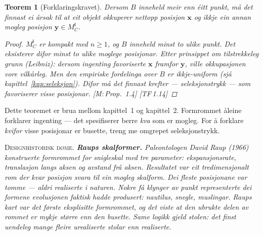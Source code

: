 \documentclass[10pt]{book}
\theoremstyle{definition}
\theoremstyle{plain}
\newtheorem{teorem}[definisjon]{Teorem}
\theoremstyle{remark}
\newenvironment{designhistorie}%
  {\medskip\noindent\textsc{Designhistorisk d\o me.}\itshape\enspace}%
  {\medskip}
\newcommand{\MC}{M^{\mathsf{I}}_C}
\newcommand{\TF}[1]{\textnormal{[TF\,#1]}}
\newcommand{\Mref}[1]{\textnormal{[M:\,#1]}}
\begin{document}
\begin{teorem}[Forklaringskravet]\label{thm:forklaring}
Dersom $B$ inneheld meir enn \' eitt punkt, m\aa{} det finnast ei \aa rsak til at eit objekt okkuperer nettopp posisjon $\bm{x}$ og ikkje ein annan mogleg posisjon $\bm{y} \in \MC$.

\begin{proof}
$\MC$ er kompakt med $n \geq 1$, og $B$ inneheld minst to ulike punkt. Det eksisterer difor minst to ulike moglege posisjonar. Etter prinsippet om tilstrekkeleg grunn (Leibniz): dersom ingenting favoriserte $\bm{x}$ framfor $\bm{y}$, ville okkupasjonen vore vilk\aa rleg. Men den empiriske fordelinga over $B$ er ikkje-uniform (sjå kapittel~\ref{kap:seleksjon}). Difor m\aa{} det finnast krefter --- \emph{seleksjonstrykk} --- som favoriserer visse posisjonar. \Mref{Prop.~1.4} \TF{1.14}
\end{proof}
\end{teorem}

Dette teoremet er brua mellom kapittel~1 og kapittel~2. Formrommet åleine forklarer ingenting --- det spesifiserer berre \emph{kva} som er mogleg. For \aa{} forklare \emph{kvifor} visse posisjonar er busette, treng me omgrepet seleksjonstrykk.

\begin{designhistorie}
\textbf{Raups skalformer.} Paleontologen David Raup (1966) konstruerte formrommet for snigleskal med tre parameter: ekspansjonsrate, translasjon langs aksen og avstand fr\aa{} aksen. Resultatet var eit tredimensjonalt rom der kvar posisjon svara til ein mogleg skalform. Dei fleste posisjonane var tomme --- aldri realiserte i naturen. Nokre f\aa{} klynger av punkt representerte dei formene evolusjonen faktisk hadde produsert: nautilus, snegle, muslingar. Raups kart var det f\o rste eksplisitte formrommet, og det viste at den ubrukte delen av rommet er mykje st\o rre enn den busette. Same logikk gjeld stolen: det finst uendeleg mange fleire urealiserte stolar enn realiserte.
\end{designhistorie}
\end{document}
